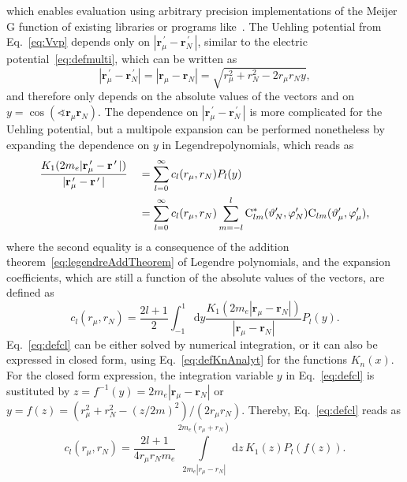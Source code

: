 which enables evaluation using arbitrary precision implementations of the Meijer G function of existing libraries or programs like~\cite{Mathematica,mpmath}. The Uehling potential from Eq.~\eqref{eq:Vvp} depends only on $|\mathbf{r}_\mu^{\,\prime} - \mathbf{r}_N^{\,\prime}\,|$, similar to the electric potential~\eqref{eq:defmulti}, which can be written as
\begin{equation}
|\mathbf{r}_\mu^{\,\prime} - \mathbf{r}_N^{\,\prime}|
=|\mathbf{r}_\mu - \mathbf{r}_N|
=\sqrt{r_\mu^2 + r_N^2 - 2 r_\mu r_N y},
\end{equation}
and therefore only depends on the absolute values of the vectors and on ${y}{=}{\cos(\sphericalangle \mathbf{r}_\mu\mathbf{r}_N)}$. The dependence on $|\mathbf{r}_\mu^{\,\prime} - \mathbf{r}_N^{\,\prime}\,|$ is more complicated for the Uehling potential, but a multipole expansion can be performed nonetheless by expanding the dependence on $y$ in Legendrepolynomials, which reads as
\begin{alignat}{2}
&\frac{K_1(2m_e{|\mathbf{r}_\mu^{\,\prime} - \mathbf{r}^{\,\prime}\,|})}{|\mathbf{r}_\mu^{\,\prime} - \mathbf{r}^{\,\prime}\,|}
&&=\sum_{l=0}^\infty c_l(r_\mu,r_N) P_l(y)\\
&&&=\sum_{l=0}^\infty c_l(r_\mu,r_N) \sum_{m=-l}^l \text{C}^*_{lm}(\vartheta_N^{\prime},\varphi_N^{\prime})\text{C}_{lm}(\vartheta_\mu^\prime,\varphi_\mu^\prime),\notag
\end{alignat}
where the second equality is a consequence of the addition theorem~\eqref{eq:legendreAddTheorem} of Legendre polynomials, and the expansion coefficients, which are still a function of the absolute values of the vectors, are defined as
\begin{equation}
c_l(r_\mu,r_N)=\frac{2l+1}{2} \int_{-1}^1 \text{d}y \frac{K_1(2m_e{|\mathbf{r}_\mu - \mathbf{r}_N|})}{|\mathbf{r}_\mu - \mathbf{r}_N|} P_l(y).
\label{eq:defcl}
\end{equation}
Eq.~\eqref{eq:defcl} can be either solved by numerical integration, or it can also be expressed in closed form, using Eq.~\eqref{eq:defKnAnalyt} for the functions $K_n(x)$. For the closed form expression, the integration variable $y$ in Eq.~\eqref{eq:defcl} is sustituted by $z=f^{-1}(y)=2m_e{|\mathbf{r}_\mu - \mathbf{r}_N|}$ or $y=f(z)=(r_\mu^2+r_N^2 -(z/2m)^2)/(2r_\mu r_N)$. Thereby, Eq.~\eqref{eq:defcl} reads as
\begin{equation}
c_l(r_\mu,r_N)=\frac{2l+1}{4 r_\mu r_N m_e}\mathop\int\limits_{2m_e{|r_\mu - r_N|}}^{2m_e{(r_\mu + r_N)}} \text{d}z\, K_1(z)P_l(f(z)).
\label{eq:defcl2}
\end{equation}
